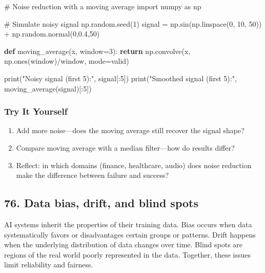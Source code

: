 \documentclass[
  letterpaper,
  DIV=11,
  numbers=noendperiod]{scrreprt}
\newenvironment{Shaded}{\begin{snugshade}}{\end{snugshade}}
\newcommand{\BuiltInTok}[1]{\textcolor[rgb]{0.00,0.23,0.31}{#1}}
\newcommand{\CommentTok}[1]{\textcolor[rgb]{0.37,0.37,0.37}{#1}}
\newcommand{\ControlFlowTok}[1]{\textcolor[rgb]{0.00,0.23,0.31}{\textbf{#1}}}
\newcommand{\DecValTok}[1]{\textcolor[rgb]{0.68,0.00,0.00}{#1}}
\newcommand{\FloatTok}[1]{\textcolor[rgb]{0.68,0.00,0.00}{#1}}
\newcommand{\ImportTok}[1]{\textcolor[rgb]{0.00,0.46,0.62}{#1}}
\newcommand{\KeywordTok}[1]{\textcolor[rgb]{0.00,0.23,0.31}{\textbf{#1}}}
\newcommand{\NormalTok}[1]{\textcolor[rgb]{0.00,0.23,0.31}{#1}}
\newcommand{\OperatorTok}[1]{\textcolor[rgb]{0.37,0.37,0.37}{#1}}
\newcommand{\StringTok}[1]{\textcolor[rgb]{0.13,0.47,0.30}{#1}}
\providecommand{\tightlist}{%
  \setlength{\itemsep}{0pt}\setlength{\parskip}{0pt}}
\begin{document}
\begin{Shaded}
\begin{Highlighting}[]
\CommentTok{\# Noise reduction with a moving average}
\ImportTok{import}\NormalTok{ numpy }\ImportTok{as}\NormalTok{ np}

\CommentTok{\# Simulate noisy signal}
\NormalTok{np.random.seed(}\DecValTok{1}\NormalTok{)}
\NormalTok{signal }\OperatorTok{=}\NormalTok{ np.sin(np.linspace(}\DecValTok{0}\NormalTok{, }\DecValTok{10}\NormalTok{, }\DecValTok{50}\NormalTok{)) }\OperatorTok{+}\NormalTok{ np.random.normal(}\DecValTok{0}\NormalTok{,}\FloatTok{0.4}\NormalTok{,}\DecValTok{50}\NormalTok{)}

\KeywordTok{def}\NormalTok{ moving\_average(x, window}\OperatorTok{=}\DecValTok{3}\NormalTok{):}
    \ControlFlowTok{return}\NormalTok{ np.convolve(x, np.ones(window)}\OperatorTok{/}\NormalTok{window, mode}\OperatorTok{=}\StringTok{\textquotesingle{}valid\textquotesingle{}}\NormalTok{)}

\BuiltInTok{print}\NormalTok{(}\StringTok{"Noisy signal (first 5):"}\NormalTok{, signal[:}\DecValTok{5}\NormalTok{])}
\BuiltInTok{print}\NormalTok{(}\StringTok{"Smoothed signal (first 5):"}\NormalTok{, moving\_average(signal)[:}\DecValTok{5}\NormalTok{])}
\end{Highlighting}
\end{Shaded}

\subsubsection{Try It Yourself}\label{try-it-yourself-74}

\begin{enumerate}
\def\labelenumi{\arabic{enumi}.}
\tightlist
\item
  Add more noise---does the moving average still recover the signal
  shape?
\item
  Compare moving average with a median filter---how do results differ?
\item
  Reflect: in which domains (finance, healthcare, audio) does noise
  reduction make the difference between failure and success?
\end{enumerate}

\subsection{76. Data bias, drift, and blind
spots}\label{data-bias-drift-and-blind-spots}

AI systems inherit the properties of their training data. Bias occurs
when data systematically favors or disadvantages certain groups or
patterns. Drift happens when the underlying distribution of data changes
over time. Blind spots are regions of the real world poorly represented
in the data. Together, these issues limit reliability and fairness.
\end{document}

